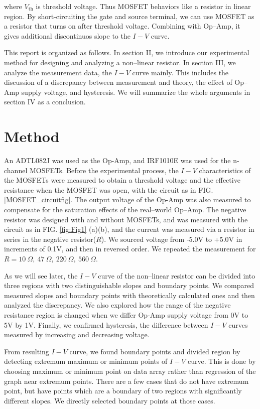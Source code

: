 \documentclass[%
 aip,
amsmath,amssymb,
reprint,
]{revtex4-1}
\begin{document}
\noindent where $V_{\textrm{th}}$ is threshold voltage. Thus MOSFET behaviors like a resistor in linear region. By short-circuiting the gate and source terminal, we can use MOSFET as a resistor that turns on after threshold voltage. Combining with Op--Amp, it gives additional discontinuos slope to the $I-V$ curve.

This report is organized as follows. In section II, we introduce our experimental method for designing and analyzing a non--linear resistor. In section III, we analyze the measurement data, the $I-V$ curve mainly. This includes the discussion of a discrepancy between measurement and theory, the effect of Op--Amp supply voltage, and hysteresis. We will summarize the whole arguments in section IV as a conclusion.

\section{\label{sec:Method} Method}

An ADTL082J was used as the Op-Amp, and IRF1010E was used for the n-channel MOSFETs. Before the experimental process, the $I-V$ characteristics of the MOSFETs were measured to obtain a threshold voltage and the effective resistance when the MOSFET was open, with the circuit as in FIG. \ref{MOSFET_circuitfig}. The output voltage of the Op-Amp was also measured to compensate for the saturation effects of the real--world Op--Amp. The negative resistor was designed with and without MOSFETs, and was measured with the circuit as in FIG. \ref{fig:Fig1} (a)(b), and the current was measured via a resistor in series in the negative resistor($R$). We sourced voltage from -5.0V to +5.0V in increments of 0.1V, and then in reversed order. We repeated the measurement for $R=10\>\Omega,\>47\>\Omega,\>220\>\Omega,\>560\>\Omega$.

As we will see later, the $I-V$ curve of the non--linear resistor can be divided into three regions with two distinguishable slopes and boundary points. We compared measured slopes and boundary points with theoretically calculated ones and then analyzed the discrepancy. We also explored how the range of the negative resistance region is changed when we differ Op-Amp supply voltage from 0V to 5V by 1V. Finally, we confirmed hysteresis, the difference between $I-V$ curves measured by increasing and decreasing voltage.

From resulting $I-V$ curve, we found boundary points and divided region by detecting extremum maximum or minimum points of $I-V$ curve. This is done by choosing maximum or minimum point on data array rather than regression of the graph near extremum points. There are a few cases that do not have extremum point, but have points which are a boundary of two regions with significantly different slopes. We directly selected boundary points at those cases.
\end{document}

